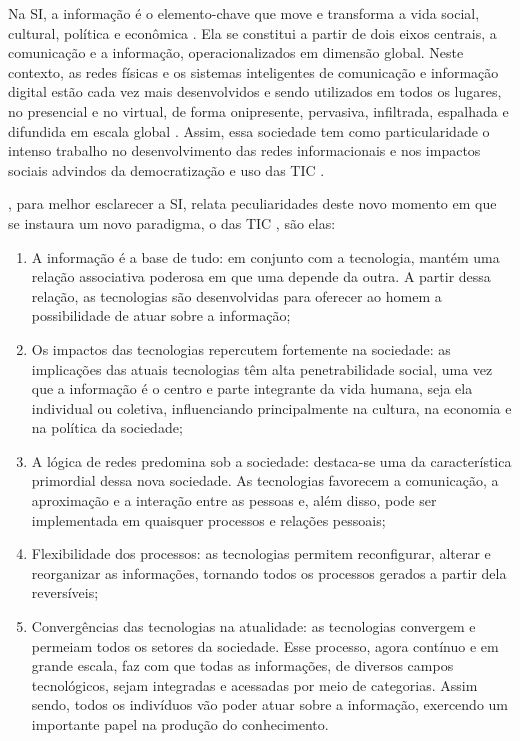 \documentclass[portuguese]{textolivre}
\begin{document}
Na SI, a informação é o elemento-chave que move e transforma a vida
social, cultural, política e econômica \cite{castells2016}. Ela se
constitui a partir de dois eixos centrais, a comunicação e a informação,
operacionalizados em dimensão global. Neste contexto, as redes físicas e
os sistemas inteligentes de comunicação e informação digital estão cada
vez mais desenvolvidos e sendo utilizados em todos os lugares, no
presencial e no virtual, de forma onipresente, pervasiva, infiltrada,
espalhada e difundida em escala global
\cite{takahashi2000, santaella2013}. Assim, essa sociedade tem como
particularidade o intenso trabalho no desenvolvimento das redes
informacionais e nos impactos sociais advindos da democratização e uso
das TIC \cite{castells2002, sorj2003}.

\textcite{castells2016}, para melhor esclarecer a SI, relata peculiaridades
deste novo momento em que se instaura um novo paradigma, o das TIC
\cite{freitas2015}, são elas:

\begin{enumerate}
\def\labelenumi{\alph{enumi})}
\item
  A informação é a base de tudo: em conjunto com a tecnologia, mantém
  uma relação associativa poderosa em que uma depende da
  outra. A partir dessa relação, as tecnologias são
  desenvolvidas para oferecer ao homem a possibilidade de
  atuar sobre a informação;
\item
  Os impactos das tecnologias repercutem fortemente na sociedade: as
  implicações das atuais tecnologias têm alta
  penetrabilidade  social, uma vez que a informação é o
  centro e parte integrante da  vida humana, seja ela
  individual ou coletiva, influenciando  principalmente na
  cultura, na economia e na política da sociedade;
\item
  A lógica de redes predomina sob a sociedade: destaca-se uma da
  característica primordial dessa nova sociedade. As
  tecnologias  favorecem a comunicação, a aproximação e a
  interação entre as  pessoas e, além disso, pode ser
  implementada em quaisquer  processos e relações
  pessoais;
\item
  Flexibilidade dos processos: as tecnologias permitem reconfigurar,
  alterar e reorganizar as informações, tornando todos os
  processos  gerados a partir dela reversíveis;
\item
  Convergências das tecnologias na atualidade: as tecnologias
  convergem e permeiam todos os setores da sociedade.
  Esse processo,  agora contínuo e em grande escala, faz
  com que todas as  informações, de diversos campos
  tecnológicos, sejam integradas e  acessadas por meio de
  categorias. Assim sendo, todos os indivíduos  vão poder
  atuar sobre a informação, exercendo um importante papel 
  na produção do conhecimento.
\end{enumerate}
\end{document}
